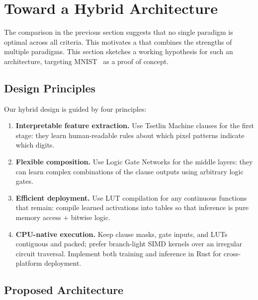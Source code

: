 \section{Toward a Hybrid Architecture}
\label{sec:hybrid}

The comparison in the previous section suggests that no single paradigm
is optimal across all criteria. This motivates a  that combines the strengths of multiple paradigms. This
section sketches a working hypothesis for such an architecture,
targeting MNIST~\cite{lecun1998mnist} as a proof of concept.

\subsection{Design Principles}

Our hybrid design is guided by four principles:

\begin{enumerate}[leftmargin=2em]
  \item \textbf{Interpretable feature extraction.} Use Tsetlin
    Machine clauses for the first stage: they learn human-readable
    rules about which pixel patterns indicate which digits.
  \item \textbf{Flexible composition.} Use Logic Gate Networks for
    the middle layers: they can learn complex combinations of the
    clause outputs using arbitrary logic gates.
  \item \textbf{Efficient deployment.} Use LUT compilation for
    any continuous functions that remain: compile learned activations
    into tables so that inference is pure memory access + bitwise
    logic.
  \item \textbf{CPU-native execution.} Keep clause masks, gate inputs,
    and LUTs contiguous and packed; prefer branch-light SIMD kernels over
    an irregular circuit traversal. Implement both training and inference
    in Rust for cross-platform deployment.
\end{enumerate}

\subsection{Proposed Architecture}

